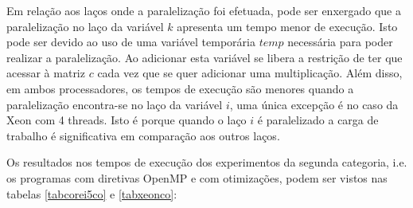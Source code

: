 \documentclass[a4paper,12pt,fleqn]{article}
\begin{document}
Em relação aos laços onde a paralelização foi efetuada, pode ser enxergado que a paralelização no laço da variável $k$ apresenta um tempo menor de execução. Isto pode ser devido ao uso de uma variável temporária $temp$ necessária para poder realizar a paralelização. Ao adicionar esta variável se libera a restrição de ter que acessar à matriz $c$ cada vez que se quer adicionar uma multiplicação. Além disso, em ambos processadores, os tempos de execução são menores quando a paralelização encontra-se no laço da variável $i$, uma única excepção é no caso da Xeon com 4 threads. Isto é porque quando o laço $i$ é paralelizado a carga de trabalho é significativa em comparação aos outros laços.

Os resultados nos tempos de execução dos experimentos da segunda categoria, i.e. os programas com diretivas OpenMP e com otimizações, podem ser vistos nas tabelas \ref{tabcorei5co} e \ref{tabxeonco}: 
\end{document}
